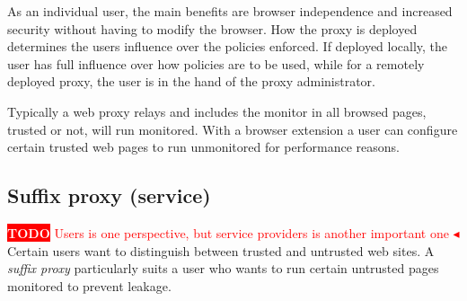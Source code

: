 \documentclass{llncs}
\newcommand{\todo}[1]{\colorbox{red}{\textcolor{white}{\sffamily\bfseries\scriptsize TODO}} \textcolor{red}{#1} \textcolor{red}{$\blacktriangleleft$}}
\begin{document}
As an individual user, the main benefits are browser independence and  
increased security without having to modify the browser. How the proxy is 
deployed determines the users influence over 
the policies enforced. If deployed locally, the user has full influence over 
how policies are to be used, while for a remotely deployed proxy, the user is 
in the hand of the proxy administrator. 

Typically a web proxy relays and includes the monitor in all browsed pages, 
trusted or not, will run monitored. With a browser extension a user can
configure certain trusted web pages to run unmonitored for performance reasons.


\subsection{Suffix proxy (service)}

\todo{Users is one perspective, but  service providers is another
  important one}
Certain users want to distinguish between trusted and untrusted web sites.
A \emph{suffix proxy} particularly suits a user who wants to run certain untrusted 
pages monitored to prevent leakage.
\end{document}
